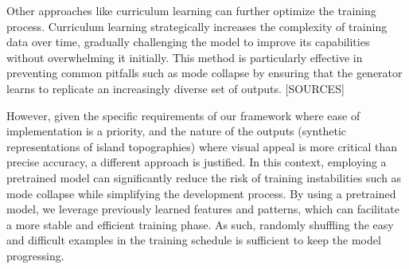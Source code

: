 Other approaches like curriculum learning can further optimize the training process. Curriculum learning strategically increases the complexity of training data over time, gradually challenging the model to improve its capabilities without overwhelming it initially. This method is particularly effective in preventing common pitfalls such as mode collapse by ensuring that the generator learns to replicate an increasingly diverse set of outputs. [SOURCES]

However, given the specific requirements of our framework where ease of implementation is a priority, and the nature of the outputs (synthetic representations of island topographies) where visual appeal is more critical than precise accuracy, a different approach is justified. In this context, employing a pretrained model can significantly reduce the risk of training instabilities such as mode collapse while simplifying the development process. By using a pretrained model, we leverage previously learned features and patterns, which can facilitate a more stable and efficient training phase. As such, randomly shuffling the easy and difficult examples in the training schedule is sufficient to keep the model progressing.




